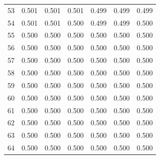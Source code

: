 \documentclass[]{elsarticle}
\begin{document}
\begin{appendix}
\begin{table}[H]
\begin{tabular}[c]{lcccccc}
53&0.501&0.501&0.501&0.499&0.499&0.499\\
54&0.501&0.501&0.500&0.499&0.499&0.500\\
55&0.500&0.500&0.500&0.500&0.500&0.500\\
56&0.500&0.500&0.500&0.500&0.500&0.500\\
57&0.500&0.500&0.500&0.500&0.500&0.500\\
58&0.500&0.500&0.500&0.500&0.500&0.500\\
59&0.500&0.500&0.500&0.500&0.500&0.500\\
60&0.500&0.500&0.500&0.500&0.500&0.500\\
61&0.500&0.500&0.500&0.500&0.500&0.500\\
62&0.500&0.500&0.500&0.500&0.500&0.500\\
63&0.500&0.500&0.500&0.500&0.500&0.500\\
64&0.500&0.500&0.500&0.500&0.500&0.500\\
		\hline
	\end{tabular}
\end{table}







\end{appendix}
\end{document}
